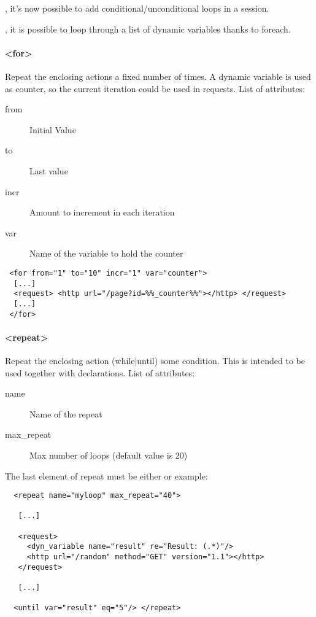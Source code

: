 \documentclass{TSUNG-en}
\begin{document}
, it's now possible to add conditional/unconditional loops in a session.

, it is possible to loop through a list of dynamic variables thanks to foreach.

\paragraph{<for>}


Repeat the enclosing actions a fixed number of times. A dynamic
variable is used as counter, so the current iteration could be used in
requests. List of attributes:

\begin{description}
\item[from] Initial Value
\item[to]   Last value
\item[incr] Amount to increment in each iteration
\item[var]  Name of the variable to hold the counter
\end{description}

\begin{Verbatim}
 <for from="1" to="10" incr="1" var="counter">
  [...]
  <request> <http url="/page?id=%%_counter%%"></http> </request>
  [...]
 </for>
\end{Verbatim}

\paragraph{<repeat>}
Repeat the enclosing action (while|until) some condition. This is
intended to be used together with  declarations. List of
attributes:

\begin{description}
\item[name] Name of the repeat
\item[max\_repeat] Max number of loops (default value is 20)
\end{description}

The last element of repeat must be either  or  example:
\begin{Verbatim}
  <repeat name="myloop" max_repeat="40">

   [...]

   <request>
     <dyn_variable name="result" re="Result: (.*)"/>
     <http url="/random" method="GET" version="1.1"></http>
   </request>

   [...]

  <until var="result" eq="5"/> </repeat>
\end{Verbatim}
\end{document}
